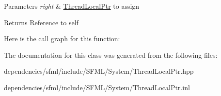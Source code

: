 \begin{DoxyParams}{Parameters}
{\em right} & \hyperlink{classsf_1_1_thread_local_ptr}{Thread\+Local\+Ptr} to assign\\
\hline
\end{DoxyParams}
\begin{DoxyReturn}{Returns}
Reference to self 
\end{DoxyReturn}
Here is the call graph for this function\+:


The documentation for this class was generated from the following files\+:\begin{DoxyCompactItemize}
\item 
dependencies/sfml/include/\+S\+F\+M\+L/\+System/Thread\+Local\+Ptr.\+hpp\item 
dependencies/sfml/include/\+S\+F\+M\+L/\+System/Thread\+Local\+Ptr.\+inl\end{DoxyCompactItemize}
